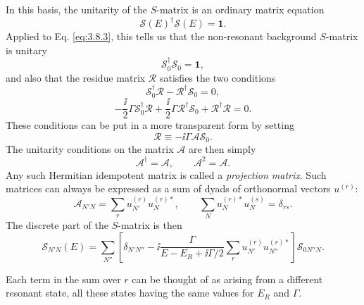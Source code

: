 In this basis, the unitarity of the $S$-matrix is an ordinary matrix equation
\begin{equation}
  \mathcal S(E)^\dagger\mathcal S(E)=\mathbf{1}.
  \tag{3.8.4}\label{eq:3.8.4}
\end{equation}
Applied to Eq. \eqref{eq:3.8.3}, this tells us that the non-resonant background
$S$-matrix is unitary
\begin{equation}
  \mathcal S_0^\dagger\mathcal S_0=\mathbf{1},
  \tag{3.8.5}\label{eq:3.8.5}
\end{equation}
and also that the residue matrix $\mathcal R$ satisfies the two conditions
\begin{equation}
  \mathcal S_0^\dagger\mathcal R-\mathcal R^\dagger\mathcal S_0=0,
  \tag{3.8.6}\label{eq:3.8.6}
\end{equation}
\begin{equation}
  -\frac{\ii}{2}\Gamma\mathcal S_0^\dagger\mathcal R
  +\frac{\ii}{2}\Gamma\mathcal R^\dagger\mathcal S_0
  +\mathcal R^\dagger\mathcal R=0.
  \tag{3.8.7}\label{eq:3.8.7}
\end{equation}
These conditions can be put in a more transparent form by setting
\begin{equation}
  \mathcal R\equiv-\ii\Gamma\mathcal A\mathcal S_0.
  \tag{3.8.8}\label{eq:3.8.8}
\end{equation}
The unitarity conditions on the matrix $\mathcal A$ are then simply
\begin{equation}
  \mathcal A^\dagger=\mathcal A,
  \qquad \mathcal A^2=\mathcal A.
  \tag{3.8.9}\label{eq:3.8.9}
\end{equation}
Any such Hermitian idempotent matrix is called a \emph{projection matrix}.
Such matrices can always be expressed as a sum of dyads of orthonormal vectors
$u^{(r)}$:
\begin{equation}
  \mathcal A_{N'N}=\sum_r u_{N'}^{(r)}u_N^{(r)*},
  \qquad \sum_Nu_N^{(r)*}u_N^{(s)}=\delta_{rs}.
  \tag{3.8.10}\label{eq:3.8.10}
\end{equation}
The discrete part of the $S$-matrix is then
\begin{equation}
  \mathcal S_{N'N}(E)=\sum_{N''}
  \left[\delta_{N'N''}-\ii\frac{\Gamma}{E-E_R+\ii\Gamma/2}
  \sum_r u_{N'}^{(r)}u_{N''}^{(r)*}\right]\mathcal S_{0N''N}.
  \tag{3.8.11}\label{eq:3.8.11}
\end{equation}

Each term in the sum over $r$ can be thought of as arising from a different
resonant state, all these states having the same values for $E_R$ and
$\Gamma$.

